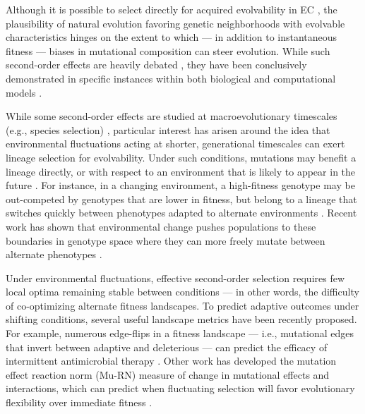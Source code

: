 Although it is possible to select directly for acquired evolvability in EC \citep{mengistu2016evolvability}, the plausibility of natural evolution favoring genetic neighborhoods with evolvable characteristics hinges on the extent to which --- in addition to instantaneous fitness \citep{watson2016how} --- biases in mutational composition can steer evolution.
While such second-order effects are heavily debated \citep{wagner2021adaptive,akay2016there,keller1999levels,altenberg1995genome,yoshimura1996evolution,yoshimura1991individual,pigliucci2008evolvability}, they have been conclusively demonstrated in specific instances within both biological and computational models \citep{sung2012driftbarrier,wilke2001evolution,pyo2025evolutionary,wagner2021adaptive,akay2016there,keller1999levels,wagner2017information,kumawat2024evolution,barnett2025experimental,steinberg2016environmental,hayden2011cryptic,gupta2022hostparasite,zaman2014coevolution,richter2009detecting,grefenstette1999evolvability}.

While some second-order effects are studied at macroevolutionary timescales (e.g., species selection) \citep{jablonski2008species,stanley1975theory,reznick2009darwin}, particular interest has arisen around the idea that environmental fluctuations acting at shorter, generational timescales \citep{bell2017evolutionary,bell2010fluctuating} can exert lineage selection for evolvability.
Under such conditions, mutations may benefit a lineage directly, or with respect to an environment that is likely to appear in the future \citep{parter2008facilitated}.
For instance, in a changing environment, a high-fitness genotype may be out-competed by genotypes that are lower in fitness, but belong to a lineage that switches quickly between phenotypes adapted to alternate environments \citep{woods2011secondorder}.
Recent work has shown that environmental change pushes populations to these boundaries in genotype space where they can more freely mutate between alternate phenotypes \citep{kumawat2024evolution,barnett2025experimental,kussell2006polymerpopulation,ancel2005evolution}.

Under environmental fluctuations, effective second-order selection requires few local optima remaining stable between conditions --- in other words, the difficulty of co-optimizing alternate fitness landscapes.
To predict adaptive outcomes under shifting conditions, several useful landscape metrics have been recently proposed.
For example, numerous edge-flips in a fitness landscape --- i.e., mutational edges that invert between adaptive and deleterious --- can predict the efficacy of intermittent antimicrobial therapy \citep{chen2024inverted}.
Other work has developed the mutation effect reaction norm (Mu-RN) measure of change in mutational effects and interactions, which can predict when fluctuating selection will favor evolutionary flexibility over immediate fitness \citep{ogbunugafor2022mutation}.

